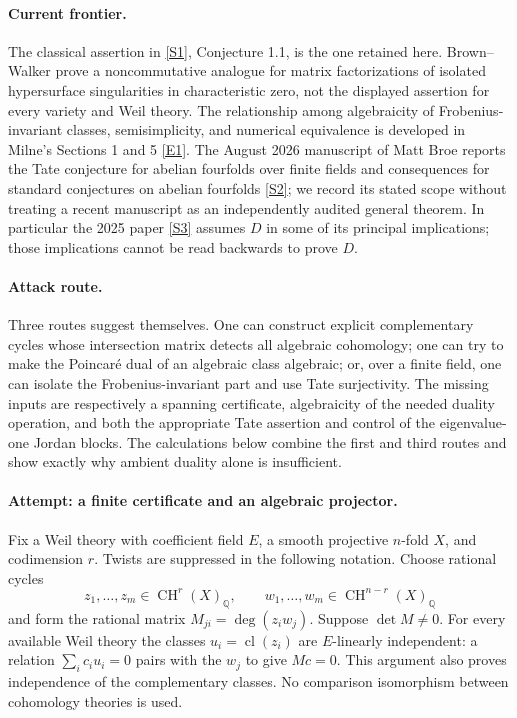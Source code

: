 \documentclass[11pt,a4paper]{article}
\newcommand{\Q}{\mathbb{Q}}
\newcommand{\sref}[2]{\hyperlink{source:#1:#2}{[S#2]}}
\newcommand{\eref}[2]{\hyperlink{extra:#1:#2}{[E#2]}}
\numberwithin{equation}{section}
\begin{document}
\paragraph{Current frontier.}
The classical assertion in \sref{30006693}{1}, Conjecture 1.1, is the one
retained here. Brown--Walker prove a noncommutative analogue for matrix
factorizations of isolated hypersurface singularities in characteristic
zero, not the displayed assertion for every variety and Weil theory.
The relationship among algebraicity of Frobenius-invariant classes,
semisimplicity, and numerical equivalence is developed in Milne's
Sections 1 and 5 \eref{30006693}{1}. The August 2026 manuscript of Matt Broe
reports the Tate conjecture for abelian fourfolds over finite fields and
consequences for standard conjectures on abelian fourfolds \sref{30006693}{2};
we record its stated scope without treating a recent manuscript as an
independently audited general theorem. In particular the 2025 paper
\sref{30006693}{3} assumes $D$ in some of its principal implications; those
implications cannot be read backwards to prove $D$.

\paragraph{Attack route.}
Three routes suggest themselves. One can construct explicit complementary
cycles whose intersection matrix detects all algebraic cohomology; one
can try to make the Poincar\'e dual of an algebraic class algebraic; or,
over a finite field, one can isolate the Frobenius-invariant part and use
Tate surjectivity. The missing inputs are respectively a spanning
certificate, algebraicity of the needed duality operation, and both the
appropriate Tate assertion and control of the eigenvalue-one Jordan
blocks. The calculations below combine the first and third routes and
show exactly why ambient duality alone is insufficient.

\paragraph{Attempt: a finite certificate and an algebraic projector.}
Fix a Weil theory with coefficient field $E$, a smooth projective $n$-fold
$X$, and codimension $r$. Twists are suppressed in the following notation.
Choose rational cycles
\[
 z_1,\ldots,z_m\in\operatorname{CH}^r(X)_{\Q},\qquad
 w_1,\ldots,w_m\in\operatorname{CH}^{n-r}(X)_{\Q}
\]
and form the rational matrix $M_{ji}=\deg(z_iw_j)$. Suppose
$\det M\ne0$. For every available Weil theory the classes
$u_i=\operatorname{cl}(z_i)$ are $E$-linearly independent: a relation
$\sum_i c_i u_i=0$ pairs with the $w_j$ to give $Mc=0$.
This argument also proves independence of the complementary classes.
No comparison isomorphism between cohomology theories is used.
\end{document}

